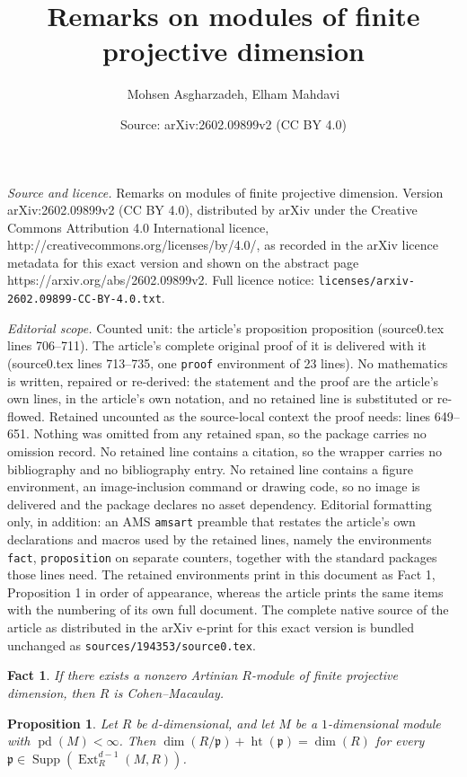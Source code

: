 \documentclass[10pt,a4paper]{amsart}
\title{Remarks on modules of finite projective dimension}
\author{Mohsen Asgharzadeh, Elham Mahdavi}
\date{Source: arXiv:2602.09899v2 (CC BY 4.0)}
\newtheorem{fact}{Fact}
\newtheorem{proposition}{Proposition}
\newcommand{\Ext}{\operatorname{Ext}}
\newcommand{\Supp}{\operatorname{Supp}}
\newcommand{\pd}{\operatorname{pd}}
\begin{document}
\maketitle

\noindent\emph{Source and licence.} Remarks on modules of finite projective dimension. Version arXiv:2602.09899v2 (CC BY 4.0), distributed by arXiv under the Creative Commons Attribution 4.0 International licence, http://creativecommons.org/licenses/by/4.0/, as recorded in the arXiv licence metadata for this exact version and shown on the abstract page https://arxiv.org/abs/2602.09899v2. Full licence notice: \texttt{licenses/arxiv-2602.09899-CC-BY-4.0.txt}.\par\smallskip

\noindent\textit{Editorial scope.} Counted unit: the article's proposition proposition (source0.tex lines 706--711). The article's complete original proof of it is delivered with it (source0.tex lines 713--735, one \texttt{proof} environment of 23 lines). No mathematics is written, repaired or re-derived: the statement and the proof are the article's own lines, in the article's own notation, and no retained line is substituted or re-flowed.  Retained uncounted as the source-local context the proof needs: lines 649--651.  Nothing was omitted from any retained span, so the package carries no omission record.  No retained line contains a citation, so the wrapper carries no bibliography and no bibliography entry.  No retained line contains a figure environment, an image-inclusion command or drawing code, so no image is delivered and the package declares no asset dependency.  Editorial formatting only, in addition: an AMS \texttt{amsart} preamble that restates the article's own declarations and macros used by the retained lines, namely the environments \texttt{fact}, \texttt{proposition} on separate counters, together with the standard packages those lines need.  The retained environments print in this document as Fact 1, Proposition 1 in order of appearance, whereas the article prints the same items with the numbering of its own full document.  The complete native source of the article as distributed in the arXiv e-print for this exact version is bundled unchanged as \texttt{sources/194353/source0.tex}.
\begin{fact}\label{art}
	If there exists a nonzero Artinian $R$-module of finite projective dimension, then $R$ is Cohen–Macaulay.
\end{fact}

\begin{proposition}
	Let $R$ be $d$-dimensional, and let $M$ be a $1$-dimensional module with $\pd(M) < \infty$. Then 
	\(
	\dim(R/\mathfrak p) + \operatorname{ht}(\mathfrak p) = \dim(R) 
	\) for every $\mathfrak p \in \Supp(\Ext^{d-1}_R(M,R))$.
\end{proposition}
\end{document}
